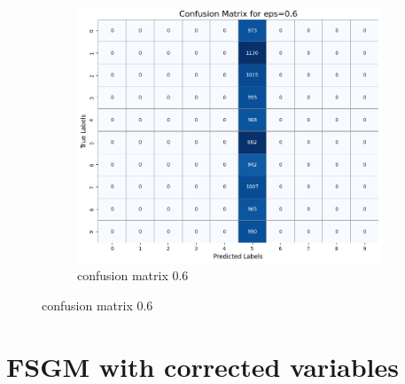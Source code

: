 \documentclass[11pt,onside]{article}
\begin{document}
\begin{figure}[h]
  \centering
  \begin{subfigure}[b]{0.49\textwidth}
    \centering
    \includegraphics[width=\textwidth]{V2_images/confusion_matrix_eps_0.6.png}
    \caption{confusion matrix 0.6}
    \label{fig:image1}
  \end{subfigure}
 
\end{figure}
\clearpage %


\section{FSGM with corrected variables}
\end{document}
